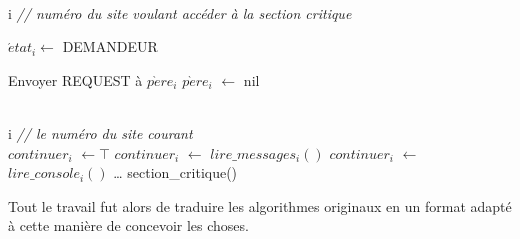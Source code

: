 \begin{algorithm}[H]
  \caption{$Supplier^{\prime}_i$()}
  \label{nt_wait}
  \Donnees
  {\\
    i \textit{// numéro du site voulant accéder à la section critique}\\
  }
  \Deb
  {
	$\acute{e}tat_i \leftarrow$ DEMANDEUR \;  
  
  	{
  		Envoyer REQUEST à $p\grave{e}re_i$ \;
  		$p\grave{e}re_i$ $\leftarrow$ nil \;
  	}
  }	
\end{algorithm}

\begin{algorithm}[H]
  \caption{$Boucle^{\prime}_i()$}
  \Donnees
  {\\
    i \textit{// le numéro du site courant}\\
  }
  \Deb
  {
  	$continuer_i$ $\leftarrow \top$ \;
	 {
	 	$continuer_i$ $\leftarrow$ $lire\_messages_i()$ \;
	 	$continuer_i$ $\leftarrow$ $lire\_console_i()$ \;
	 	\dots \;
	 	{
	 		section\_critique() \;
	 	}
	 }
  }	
\end{algorithm}

Tout le travail fut alors de traduire les algorithmes originaux en un format adapté à cette manière de concevoir les choses.